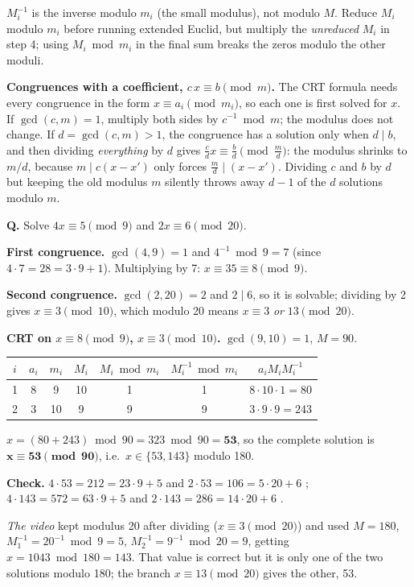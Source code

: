 \begin{trap}
$M_i^{-1}$ is the inverse modulo $m_i$ (the small modulus), not modulo $M$. Reduce $M_i$ modulo $m_i$ before running extended Euclid, but multiply the \emph{unreduced} $M_i$ in step 4; using $M_i \bmod m_i$ in the final sum breaks the zeros modulo the other moduli.
\end{trap}

\textbf{Congruences with a coefficient, $c\,x \equiv b \pmod m$.} The CRT formula needs every congruence in the form $x \equiv a_i \pmod{m_i}$, so each one is first solved for $x$. If $\gcd(c, m) = 1$, multiply both sides by $c^{-1} \bmod m$; the modulus does not change. If $d = \gcd(c, m) > 1$, the congruence has a solution only when $d \mid b$, and then dividing \emph{everything} by $d$ gives $\frac{c}{d}x \equiv \frac{b}{d} \pmod{\frac{m}{d}}$: the modulus shrinks to $m/d$, because $m \mid c(x - x')$ only forces $\frac{m}{d} \mid (x - x')$. Dividing $c$ and $b$ by $d$ but keeping the old modulus $m$ silently throws away $d - 1$ of the $d$ solutions modulo $m$.

\begin{worked}
\textbf{Q.} Solve $4x \equiv 5 \pmod 9$ and $2x \equiv 6 \pmod{20}$.

\textbf{First congruence.} $\gcd(4, 9) = 1$ and $4^{-1} \bmod 9 = 7$ (since $4 \cdot 7 = 28 = 3 \cdot 9 + 1$). Multiplying by 7: $x \equiv 35 \equiv 8 \pmod 9$.

\textbf{Second congruence.} $\gcd(2, 20) = 2$ and $2 \mid 6$, so it is solvable; dividing by 2 gives $x \equiv 3 \pmod{10}$, which modulo 20 means $x \equiv 3$ \emph{or} $13 \pmod{20}$.

\textbf{CRT on $x \equiv 8 \pmod 9$, $x \equiv 3 \pmod{10}$.} $\gcd(9, 10) = 1$, $M = 90$.
\begin{center}\small
\begin{tabular}{@{}ccccccc@{}}
\toprule
$i$ & $a_i$ & $m_i$ & $M_i$ & $M_i \bmod m_i$ & $M_i^{-1} \bmod m_i$ & $a_i M_i M_i^{-1}$\\
\midrule
1 & 8 & 9 & 10 & 1 & 1 & $8 \cdot 10 \cdot 1 = 80$\\
2 & 3 & 10 & 9 & 9 & 9 & $3 \cdot 9 \cdot 9 = 243$\\
\bottomrule
\end{tabular}
\end{center}
$x = (80 + 243) \bmod 90 = 323 \bmod 90 = \mathbf{53}$, so the complete solution is $\mathbf{x \equiv 53 \pmod{90}}$, i.e.\ $x \in \{53, 143\}$ modulo 180.

\textbf{Check.} $4 \cdot 53 = 212 = 23 \cdot 9 + 5$ and $2 \cdot 53 = 106 = 5 \cdot 20 + 6$ \checkmark; $4 \cdot 143 = 572 = 63 \cdot 9 + 5$ and $2 \cdot 143 = 286 = 14 \cdot 20 + 6$ \checkmark.

\emph{The video} kept modulus 20 after dividing ($x \equiv 3 \pmod{20}$) and used $M = 180$, $M_1^{-1} = 20^{-1} \bmod 9 = 5$, $M_2^{-1} = 9^{-1} \bmod 20 = 9$, getting $x = 1043 \bmod 180 = 143$. That value is correct but it is only one of the two solutions modulo 180; the branch $x \equiv 13 \pmod{20}$ gives the other, 53.
\end{worked}

